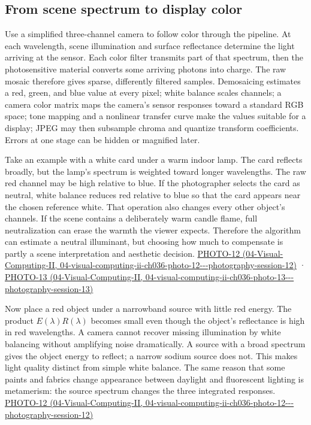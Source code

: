 \subsection{From scene spectrum to display color}\label{03-visual-computing-i-ch004-from-scene-spectrum-to-display-color}

Use a simplified three-channel camera to follow color through the pipeline. At each wavelength, scene illumination and surface reflectance determine the light arriving at the sensor. Each color filter transmits part of that spectrum, then the photosensitive material converts some arriving photons into charge. The raw mosaic therefore gives sparse, differently filtered samples. Demosaicing estimates a red, green, and blue value at every pixel; white balance scales channels; a camera color matrix maps the camera's sensor responses toward a standard RGB space; tone mapping and a nonlinear transfer curve make the values suitable for a display; JPEG may then subsample chroma and quantize transform coefficients. Errors at one stage can be hidden or magnified later.

Take an example with a white card under a warm indoor lamp. The card reflects broadly, but the lamp's spectrum is weighted toward longer wavelengths. The raw red channel may be high relative to blue. If the photographer selects the card as neutral, white balance reduces red relative to blue so that the card appears near the chosen reference white. That operation also changes every other object's channels. If the scene contains a deliberately warm candle flame, full neutralization can erase the warmth the viewer expects. Therefore the algorithm can estimate a neutral illuminant, but choosing how much to compensate is partly a scene interpretation and aesthetic decision. \href{../04-Visual-Computing-II/main.pdf\#nameddest=04-visual-computing-ii-ch036-photo-12---photography-session-12}{PHOTO-12 (04-Visual-Computing-II, 04-visual-computing-ii-ch036-photo-12-\/-\/-photography-session-12)} · \href{../04-Visual-Computing-II/main.pdf\#nameddest=04-visual-computing-ii-ch036-photo-13---photography-session-13}{PHOTO-13 (04-Visual-Computing-II, 04-visual-computing-ii-ch036-photo-13-\/-\/-photography-session-13)}

Now place a red object under a narrowband source with little red energy. The product \(E(\lambda)R(\lambda)\) becomes small even though the object's reflectance is high in red wavelengths. A camera cannot recover missing illumination by white balancing without amplifying noise dramatically. A source with a broad spectrum gives the object energy to reflect; a narrow sodium source does not. This makes light quality distinct from simple white balance. The same reason that some paints and fabrics change appearance between daylight and fluorescent lighting is metamerism: the source spectrum changes the three integrated responses. \href{../04-Visual-Computing-II/main.pdf\#nameddest=04-visual-computing-ii-ch036-photo-12---photography-session-12}{PHOTO-12 (04-Visual-Computing-II, 04-visual-computing-ii-ch036-photo-12-\/-\/-photography-session-12)}

